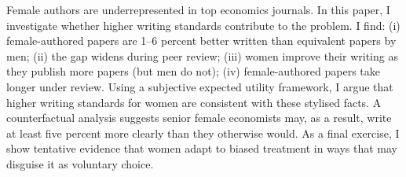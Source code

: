 

Female authors are underrepresented in top economics journals. In this paper, I investigate whether higher writing standards contribute to the problem. I find: (i) female-authored papers are 1--6 percent better written than equivalent papers by men; (ii) the gap widens during peer review; (iii) women improve their writing as they publish more papers (but men do not); (iv) female-authored papers take longer under review. Using a subjective expected utility framework, I argue that higher writing standards for women are consistent with these stylised facts. A counterfactual analysis suggests senior female economists may, as a result, write at least five percent more clearly than they otherwise would. As a final exercise, I show tentative evidence that women adapt to biased treatment in ways that may disguise it as voluntary choice.